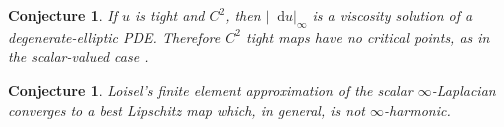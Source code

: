 \documentclass[reqno,11pt]{amsart}
\newcommand*\dif{\mathop{}\!\mathrm{d}}
\newtheorem{conjecture}[theorem]{Conjecture}
\theoremstyle{definition}
\numberwithin{equation}{section}
\begin{document}
\begin{conjecture}
If $u$ is tight and $C^2$, then $|\dif u|_\infty$ is a viscosity solution of a degenerate-elliptic PDE.
Therefore $C^2$ tight maps have no critical points, as in the scalar-valued case \cite{Yu2006}.
\end{conjecture}

\begin{conjecture}
Loisel's finite element approximation of the scalar $\infty$-Laplacian \cite{Loisel_2020} converges to a best Lipschitz map which, in general, is not $\infty$-harmonic.
\end{conjecture}

\printbibliography
\end{document}

